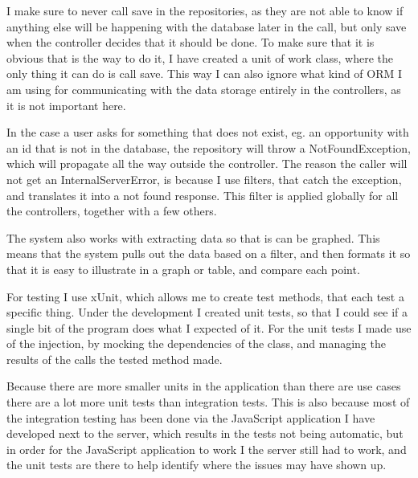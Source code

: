 I make sure to never call save in the repositories, as they are not able to know
if anything else will be happening with the database later in the call, but only
save when the controller decides that it should be done. To make sure that it is
obvious that is the way to do it, I have created a unit of work class, where the
only thing it can do is call save. This way I can also ignore what kind of ORM I
am using for communicating with the data storage entirely in the controllers, as
it is not important here.

In the case a user asks for something that does not exist, eg. an opportunity
with an id that is not in the database, the repository will throw a
NotFoundException, which will propagate all the way outside the controller. The
reason the caller will not get an InternalServerError, is because I use filters,
that catch the exception, and translates it into a not found response. This
filter is applied globally for all the controllers, together with a few others.

The system also works with extracting data so that is can be graphed. This means
that the system pulls out the data based on a filter, and then formats it so
that it is easy to illustrate in a graph or table, and compare each point.

For testing I use xUnit, which allows me to create test methods, that each test
a specific thing. Under the development I created unit tests, so that I could
see if a single bit of the program does what I expected of it. For the unit
tests I made use of the injection, by mocking the dependencies of the class, and
managing the results of the calls the tested method made.

Because there are more smaller units in the application than there are use cases
there are a lot more unit tests than integration tests. This is also because
most of the integration testing has been done via the JavaScript application I
have developed next to the server, which results in the tests not being
automatic, but in order for the JavaScript application to work I the server
still had to work, and the unit tests are there to help identify where the
issues may have shown up.
